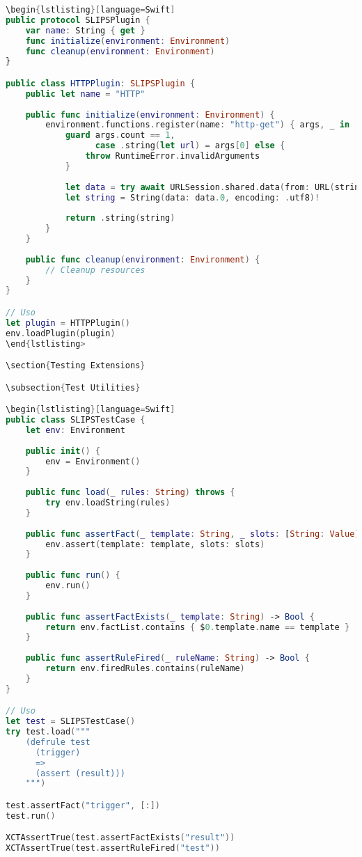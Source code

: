 \begin{lstlisting}[language=Swift]
\begin{lstlisting}[language=Swift]
public protocol SLIPSPlugin {
    var name: String { get }
    func initialize(environment: Environment)
    func cleanup(environment: Environment)
}

public class HTTPPlugin: SLIPSPlugin {
    public let name = "HTTP"
    
    public func initialize(environment: Environment) {
        environment.functions.register(name: "http-get") { args, _ in
            guard args.count == 1,
                  case .string(let url) = args[0] else {
                throw RuntimeError.invalidArguments
            }
            
            let data = try await URLSession.shared.data(from: URL(string: url)!)
            let string = String(data: data.0, encoding: .utf8)!
            
            return .string(string)
        }
    }
    
    public func cleanup(environment: Environment) {
        // Cleanup resources
    }
}

// Uso
let plugin = HTTPPlugin()
env.loadPlugin(plugin)
\end{lstlisting>

\section{Testing Extensions}

\subsection{Test Utilities}

\begin{lstlisting}[language=Swift]
public class SLIPSTestCase {
    let env: Environment
    
    public init() {
        env = Environment()
    }
    
    public func load(_ rules: String) throws {
        try env.loadString(rules)
    }
    
    public func assertFact(_ template: String, _ slots: [String: Value]) {
        env.assert(template: template, slots: slots)
    }
    
    public func run() {
        env.run()
    }
    
    public func assertFactExists(_ template: String) -> Bool {
        return env.factList.contains { $0.template.name == template }
    }
    
    public func assertRuleFired(_ ruleName: String) -> Bool {
        return env.firedRules.contains(ruleName)
    }
}

// Uso
let test = SLIPSTestCase()
try test.load("""
    (defrule test
      (trigger)
      =>
      (assert (result)))
    """)

test.assertFact("trigger", [:])
test.run()

XCTAssertTrue(test.assertFactExists("result"))
XCTAssertTrue(test.assertRuleFired("test"))
\end{lstlisting}

